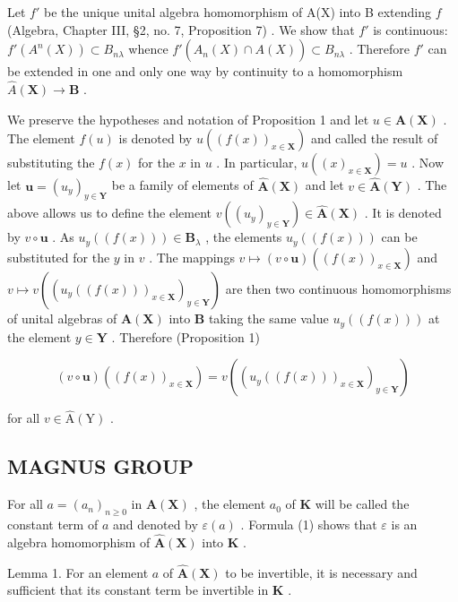 Let \(f'\) be the unique unital algebra homomorphism of A(X) into B extending \(f\) (Algebra, Chapter III, \S 2, no. 7, Proposition 7) . We show that \(f'\) is continuous: \(f'(A^n(X)) \subset B_{n\lambda}\) whence \(f'(\hat{A}_n(X) \cap A(X)) \subset B_{n\lambda}\) . Therefore \(f'\) can be extended in one and only one way by continuity to a homomorphism \(\hat{A}(\mathbf{X}) \to \mathbf{B}\) .

We preserve the hypotheses and notation of Proposition 1 and let \(u \in \hat{\mathbf{A}}(\mathbf{X})\) . The element \(f(u)\) is denoted by \(u((f(x))_{x \in \mathbf{X}})\) and called the result of substituting the \(f(x)\) for the \(x\) in \(u\) . In particular, \(u((x)_{x \in \mathbf{X}}) = u\) . Now let \(\boldsymbol{u} = (u_y)_{y \in \mathbf{Y}}\) be a family of elements of \(\hat{\mathbf{A}}(\mathbf{X})\) and let \(v \in \hat{\mathbf{A}}(\mathbf{Y})\) . The above allows us to define the element \(v((u_y)_{y \in \mathbf{Y}}) \in \hat{\mathbf{A}}(\mathbf{X})\) . It is denoted by \(v \circ \boldsymbol{u}\) . As \(u_y((f(x))) \in \mathbf{B}_{\lambda}\) , the elements \(u_y((f(x)))\) can be substituted for the \(y\) in \(v\) . The mappings \(v \mapsto (v \circ \boldsymbol{u})((f(x))_{x \in \mathbf{X}})\) and \(v \mapsto v((u_y((f(x)))_{x \in \mathbf{X}})_{y \in \mathbf{Y}})\) are then two continuous homomorphisms of unital algebras of \(\hat{\mathbf{A}}(\mathbf{X})\) into \(\mathbf{B}\) taking the same value \(u_y((f(x)))\) at the element \(y \in \mathbf{Y}\) . Therefore (Proposition 1)

\[
(v \circ \boldsymbol {u}) ((f (x))_{x \in \mathbf{X}}) = v ((u _ {y} ((f (x)))_{x \in \mathbf{X}})_{y \in \mathbf{Y}})\tag{2}
\]

for all \(v \in \hat{\mathrm{A}}(\mathrm{Y})\) .

\subsection{MAGNUS GROUP}

For all \(a = (a_n)_{n \geq 0}\) in \(\hat{\mathbf{A}}(\mathbf{X})\) , the element \(a_0\) of \(\mathbf{K}\) will be called the constant term of \(a\) and denoted by \(\varepsilon(a)\) . Formula (1) shows that \(\varepsilon\) is an algebra homomorphism of \(\hat{\mathbf{A}}(\mathbf{X})\) into \(\mathbf{K}\) .

Lemma 1. For an element \(a\) of \(\hat{\mathbf{A}}(\mathbf{X})\) to be invertible, it is necessary and sufficient that its constant term be invertible in \(\mathbf{K}\) .

